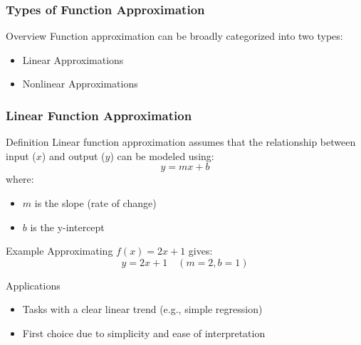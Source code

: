 \documentclass[aspectratio=169]{beamer}
\begin{document}
\begin{frame}[fragile]
    \frametitle{Types of Function Approximation}
    \begin{block}{Overview}
        Function approximation can be broadly categorized into two types:
        \begin{itemize}
            \item Linear Approximations
            \item Nonlinear Approximations
        \end{itemize}
    \end{block}
\end{frame}

\begin{frame}[fragile]
    \frametitle{Linear Function Approximation}
    \begin{block}{Definition}
        Linear function approximation assumes that the relationship between input ($x$) and output ($y$) can be modeled using:
        \begin{equation}
            y = mx + b
        \end{equation}
        where:
        \begin{itemize}
            \item $m$ is the slope (rate of change)
            \item $b$ is the y-intercept
        \end{itemize}
    \end{block}
    
    \begin{block}{Example}
        Approximating $f(x) = 2x + 1$ gives:
        \begin{equation}
            y = 2x + 1 \quad (m = 2, b = 1)
        \end{equation}
    \end{block}
    
    \begin{block}{Applications}
        \begin{itemize}
            \item Tasks with a clear linear trend (e.g., simple regression)
            \item First choice due to simplicity and ease of interpretation
        \end{itemize}
    \end{block}
\end{frame}
\end{document}
